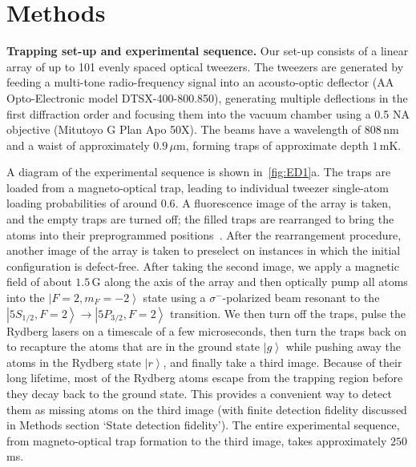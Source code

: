 \documentclass[prl,nobalancelastpage,twocolumn,superscriptaddress,nofootinbib]{revtex4}
\newcommand{\ket}[1]{\left|#1\right\rangle}
\begin{document}

\clearpage
\newpage

{
\renewcommand{\addcontentsline}[3]{}
\section{Methods}
}


\setcounter{figure}{0}
\makeatletter 
\renewcommand{\thefigure}{Extended Data Fig. \@arabic\c@figure}
\renewcommand{\fnum@figure}{\textbf{Extended Data Figure \@arabic\c@figure}}
\makeatother



\begin{footnotesize}

\noindent
\textbf{Trapping set-up and experimental sequence.}
Our set-up consists of a linear array of up to 101 evenly spaced optical
tweezers. The tweezers are generated by feeding a multi-tone radio-frequency signal into an
acousto-optic deflector (AA Opto-Electronic model DTSX-400-800.850), generating
multiple deflections in the first diffraction order and focusing them into the
vacuum chamber using a 0.5 NA objective (Mitutoyo G Plan Apo 50X). The beams
have a wavelength of $808\,$nm and a waist of approximately $0.9\,\mu$m,
forming traps of approximate depth $1\,$mK.

A diagram of the experimental sequence is shown in~\ref{fig:ED1}a. The traps
are loaded from a magneto-optical trap, leading to individual tweezer
single-atom loading probabilities of around $0.6$. A fluorescence image of the
array is taken, and the empty traps are turned off; the filled traps are
rearranged to bring the atoms into their preprogrammed
positions~\cite{Endres2016}. After the rearrangement procedure, another
image of the array is taken to preselect on instances in which the initial
configuration is defect-free. After taking the second image, we apply a
magnetic field of about $1.5\,$G along the axis of the array and then
optically pump all atoms into the $\ket{F=2, m_F = -2}$ state using a
$\sigma^{-}$-polarized beam resonant to the
$\ket{5S_{1/2},F=2}\to\ket{5P_{3/2},F=2}$ transition. We then turn off the
traps, pulse the Rydberg lasers on a timescale of a few microseconds, then
turn the traps back on to recapture the atoms that are in the ground state
$\ket{g}$ while pushing away the atoms in the Rydberg state $\ket{r}$, and
finally take a third image. Because of their long lifetime, most of the Rydberg
atoms escape from the trapping region before they decay back to the ground
state. This provides a convenient way to detect them as missing atoms on the
third image (with finite detection fidelity discussed in Methods section `State
detection fidelity'). The
entire experimental sequence, from magneto-optical trap formation to the third
image, takes approximately $250\,$ms.



\end{footnotesize}
\end{document}
